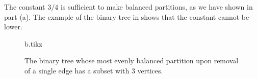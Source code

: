 The constant $3/4$ is sufficient to make balanced partitions, as we have shown in part (a).
The example of the binary tree in  shows that the constant cannot be lower.
\begin{figure}[htb]
    {b.tikz}
    \caption{The binary tree whose most evenly balanced partition upon removal of a single edge has a subset with 3 vertices.} \label{fig:B-3b}
\end{figure}

